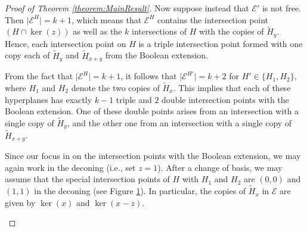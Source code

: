 \documentclass[12pt]{amsart}
\theoremstyle{definition}
\theoremstyle{remark}
\newcommand\CE{{\mathscr E}}
\begin{document}
\begin{proof}[Proof of Theorem \ref{theorem:MainResult}]
    \noindent Now suppose instead that $\CE'$ is not free. Then $\vert\CE^H\vert=k+1$, which means that $\CE^H$ contains the intersection point $(H\cap\ker(z))$ as well as the $k$ intersections of $H$ with the copies of $\tilde H_y$. Hence, each intersection point on $H$ is a triple intersection point formed with one copy each of $\tilde H_y$ and $\tilde H_{x+y}$ from the Boolean extension. 

From the fact that $\vert\CE^H\vert=k+1$, it follows that $\vert \CE^{H'} \vert = k+2$ for $H' \in \{H_1,H_2\}$, where $H_1$ and $H_2$ denote the two copies of $\tilde H_x$. This implies that each of these hyperplanes has exactly $k-1$ triple and $2$ double intersection points with the Boolean extension. One of these double points arises from an intersection with a single copy of $\tilde H_y$, and the other one from an intersection with a single copy of $\tilde H_{x+y}$.
 
Since our focus in on the intersection points with the Boolean extension, we may again work in the deconing (i.e., set $z=1$). After a change of basis, we may assume that the special intersection points of $H$ with $H_1$ and $H_2$ are $(0,0)$ and $(1,1)$ in the deconing (see Figure \ref{fig1}). In particular, the copies of $\tilde H_x$ in $\CE$ are given by $\ker(x)$ and $\ker(x-z)$.

\begin{figure}
\centering
\begin{minipage}[t]{.4\textwidth}
\caption{}\label{fig1}
\end{minipage}
\begin{minipage}[t]{.4\textwidth}
\end{minipage}
\end{figure}
\end{proof}
\end{document}
